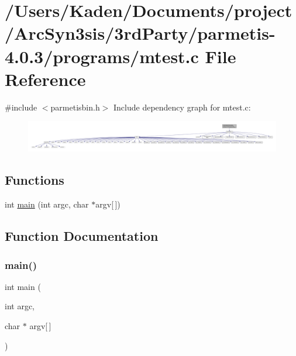 \hypertarget{a00425}{}\section{/\+Users/\+Kaden/\+Documents/project/\+Arc\+Syn3sis/3rd\+Party/parmetis-\/4.0.3/programs/mtest.c File Reference}
\label{a00425}
{\ttfamily \#include $<$parmetisbin.\+h$>$}\newline
Include dependency graph for mtest.\+c\+:\nopagebreak
\begin{figure}[H]
\begin{center}
\leavevmode
\includegraphics[width=350pt]{a00426}
\end{center}
\end{figure}
\subsection*{Functions}
\begin{DoxyCompactItemize}
\item 
int \hyperlink{a00425_a0ddf1224851353fc92bfbff6f499fa97}{main} (int argc, char $\ast$argv\mbox{[}$\,$\mbox{]})
\end{DoxyCompactItemize}


\subsection{Function Documentation}
\mbox{\label{a00425_a0ddf1224851353fc92bfbff6f499fa97}} 
\subsubsection{\texorpdfstring{main()}{main()}}
{\footnotesize\ttfamily int main (\begin{DoxyParamCaption}\item[{int}]{argc,  }\item[{char $\ast$}]{argv\mbox{[}$\,$\mbox{]} }\end{DoxyParamCaption})}

